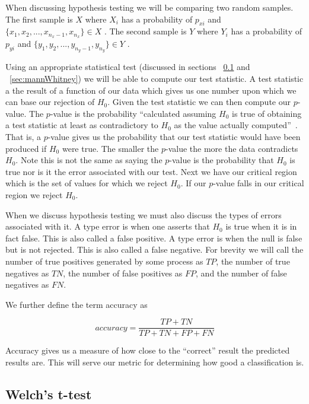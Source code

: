 When discussing hypothesis testing we will be comparing two random samples. The first sample is $X$ where  $X_i$ has a probability of  $p_{xi}$ and $\{x_1,x_2,...,x_{n_x-1} , x_{n_x}\} \in X$ . The second sample is $Y$ where  $Y_i$ has a probability of  $p_{yi}$ and $\{y_1,y_2,...,y_{n_y-1} , y_{n_y}\} \in Y$ .

Using an appropriate statistical test (discussed in sections ~\ref{sec:ttest} and ~\ref{sec:mannWhitney}) we will be able to compute our test statistic. A test statistic a the result of a function of our data which gives us one number upon which we can base our rejection of $H_0$. Given the test statistic we can then compute our $p$-value. The $p$-value is the probability ``calculated assuming $H_0$ is true of obtaining a test statistic at least as contradictory to $H_0$ as the value actually computed''~\cite{devore_probability_2011}. That is, a $p$-value gives us the probability that our test statistic would have been produced if $H_0$ were true. The smaller the $p$-value the more the data contradicts $H_0$. Note this is not the same as saying the $p$-value is the probability that $H_0$ is true nor is it the error associated with our test. Next we have our critical region which is the set of values for which we reject $H_0$. If our $p$-value falls in our critical region we reject $H_0$.

When we discuss hypothesis testing we must also discuss the types of errors associated with it. A type  error is when one asserts that $H_0$ is true when it is in fact false. This is also called a false positive. A type  error is when the null is false but is not rejected. This is also called a false negative. For brevity we will call the number of true positives generated by some process as $TP$, the number of true negatives as $TN$, the number of false positives as $FP$, and the number of false negatives as $FN$. 

We further define the term accuracy as 

\begin{equation}\label{Accuracy}
	accuracy=\frac{TP+TN}{TP+TN+FP+FN}
\end{equation}

Accuracy gives us a measure of how close to the ``correct'' result the predicted results are. This will serve our metric for determining how good a classification is. 
\subsection{Welch's t-test}\label{sec:ttest}

